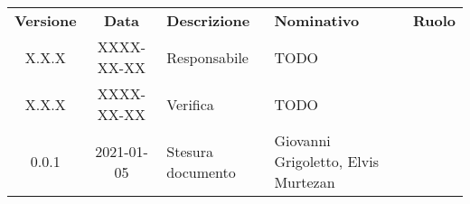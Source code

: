 {
    \renewcommand{\arraystretch}{1.5}
    \centering
    \begin{longtable}{ c c  C{3.5cm}  C{3.5cm}  c }
        \rowcolor{\primaryColor}
        \textcolor{\secondaryColor}{
        \textbf{Versione}}     & \textcolor{\secondaryColor}{\textbf{Data}}       & \textcolor{\secondaryColor}
        {\textbf{Descrizione}} & \textcolor{\secondaryColor}{\textbf{Nominativo}} & \textcolor{\secondaryColor}{\textbf{Ruolo}}                          \\


        X.X.X  & 
        XXXX-XX-XX  & 
        Responsabile & 
        TODO & 
        \responsabile{} \\

        X.X.X  & 
        XXXX-XX-XX & 
        Verifica & 
        TODO & 
        \verificatore{} \\
        
        0.0.1  & 
        2021-01-05 & 
        Stesura documento & 
        Giovanni Grigoletto, Elvis Murtezan  & 
        \redattore{} \\
    \end{longtable}
}